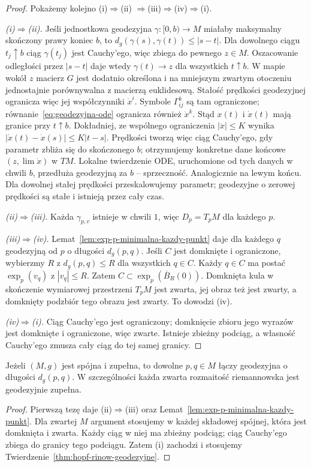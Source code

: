\begin{proof}
Pokażemy kolejno (i)$\Rightarrow$(ii)
$\Rightarrow$(iii)$\Rightarrow$(iv)$\Rightarrow$(i).

\emph{(i)$\Rightarrow$(ii).}
Jeśli jednostkowa geodezyjna
$\gamma:[0,b)\to M$ miałaby maksymalny
skończony prawy koniec $b$, to
$d_g(\gamma(s),\gamma(t))\leq|s-t|$.
Dla dowolnego ciągu $t_j\uparrow b$ ciąg $\gamma(t_j)$
jest Cauchy'ego, więc zbiega do pewnego $z\in M$.
Oszacowanie odległości przez $|s-t|$ daje wtedy
$\gamma(t)\to z$ dla wszystkich $t\uparrow b$.
W mapie wokół $z$ macierz $G$ jest dodatnio
określona i na mniejszym zwartym otoczeniu
jednostajnie porównywalna z macierzą
euklidesową. Stałość prędkości geodezyjnej
ogranicza więc jej współczynniki $\dot x^i$.
Symbole $\Gamma^k_{ij}$ są tam ograniczone;
równanie~\eqref{eq:geodezyjna-ode} ogranicza
również $\ddot x^k$. Stąd $x(t)$ i $\dot x(t)$
mają granice przy $t\uparrow b$.
Dokładniej, ze wspólnego ograniczenia $|\ddot x|\leq K$
wynika $|\dot x(t)-\dot x(s)|\leq K|t-s|$.
Prędkości tworzą więc ciąg Cauchy'ego, gdy parametr
zbliża się do skończonego $b$; otrzymujemy
konkretne dane końcowe $(z,\lim\dot x)$ w $TM$.
Lokalne twierdzenie ODE, uruchomione od tych
danych w chwili $b$, przedłuża geodezyjną
za $b$ -- sprzeczność. Analogicznie na lewym
końcu. Dla dowolnej stałej prędkości
przeskalowujemy parametr; geodezyjne o zerowej prędkości
są stałe i istnieją przez cały czas.

\emph{(ii)$\Rightarrow$(iii).}
Każda $\gamma_{p,v}$ istnieje w chwili $1$,
więc $D_p=T_pM$ dla każdego $p$.

\emph{(iii)$\Rightarrow$(iv).}
Lemat~\ref{lem:exp-p-minimalna-kazdy-punkt}
daje dla każdego $q$ geodezyjną od $p$
o długości $d_g(p,q)$. Jeśli $C$ jest domknięte
i ograniczone, wybierzmy $R$ z
$d_g(p,q)\leq R$ dla wszystkich $q\in C$.
Każdy $q\in C$ ma postać $\exp_p(v_q)$
z $|v_q|\leq R$. Zatem
$C\subset\exp_p(\overline B_R(0))$.
Domknięta kula w skończenie wymiarowej
przestrzeni $T_pM$ jest zwarta, jej obraz
też jest zwarty, a domknięty podzbiór
tego obrazu jest zwarty. To dowodzi (iv).

\emph{(iv)$\Rightarrow$(i).}
Ciąg Cauchy'ego jest ograniczony;
domknięcie zbioru jego wyrazów jest
domknięte i ograniczone, więc zwarte.
Istnieje zbieżny podciąg, a własność Cauchy'ego
zmusza cały ciąg do tej samej granicy.
\end{proof}

\begin{wniosek}
\label{cor:hopf-rinow-minimalna}
Jeżeli $(M,g)$ jest spójna i zupełna, to
dowolne $p,q\in M$ łączy geodezyjna
o długości $d_g(p,q)$. W szczególności
każda zwarta rozmaitość riemannowska
jest geodezyjnie zupełna.
\end{wniosek}
\begin{proof}
Pierwszą tezę daje (ii)$\Rightarrow$(iii)
oraz Lemat~\ref{lem:exp-p-minimalna-kazdy-punkt}.
Dla zwartej $M$ argument stosujemy w każdej składowej
spójnej, która jest domknięta i zwarta. Każdy ciąg w niej
ma zbieżny podciąg; ciąg Cauchy'ego zbiega
do granicy tego podciągu. Zatem (i) zachodzi
i stosujemy Twierdzenie~\ref{thm:hopf-rinow-geodezyjne}.
\end{proof}

